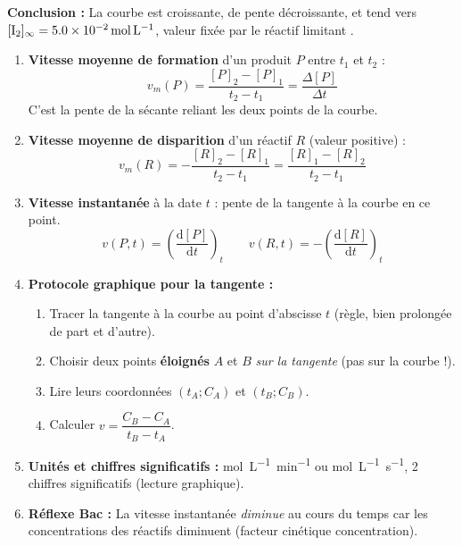 \documentclass[11pt]{article}
\newcommand{\cle}[1]{{\popxbold\color{popdark}#1}}
\begin{document}
\begin{exoresolu}
\textbf{Conclusion :} La courbe est croissante, de pente décroissante, et tend vers $[\ce{I2}]_{\infty} = \SI{5,0e-2}{mol.L^{-1}}$, valeur fixée par le réactif limitant .
\end{exoresolu}

\begin{methode}[Déterminer vitesse moyenne et vitesse instantanée à partir d'une courbe $C=f(t)$]
\begin{enumerate}
\item \textbf{Vitesse moyenne de formation} d'un produit $P$ entre $t_1$ et $t_2$ :
      \[ v_{m}(P) = \frac{[P]_2 - [P]_1}{t_2 - t_1} = \frac{\Delta [P]}{\Delta t} \]
      C'est la pente de la \cle{sécante} reliant les deux points de la courbe.
\item \textbf{Vitesse moyenne de disparition} d'un réactif $R$ (valeur positive) :
      \[ v_{m}(R) = -\frac{[R]_2 - [R]_1}{t_2 - t_1} = \frac{[R]_1 - [R]_2}{t_2 - t_1} \]
\item \textbf{Vitesse instantanée} à la date $t$ : pente de la \cle{tangente} à la courbe en ce point.
      \[ v(P,t) = \left(\frac{\mathrm{d}[P]}{\mathrm{d}t}\right)_t \qquad v(R,t) = -\left(\frac{\mathrm{d}[R]}{\mathrm{d}t}\right)_t \]
\item \textbf{Protocole graphique pour la tangente :}
      \begin{enumerate}
      \item Tracer la tangente à la courbe au point d'abscisse $t$ (règle, bien prolongée de part et d'autre).
      \item Choisir deux points \textbf{éloignés} $A$ et $B$ \emph{sur la tangente} (pas sur la courbe !).
      \item Lire leurs coordonnées $(t_A; C_A)$ et $(t_B; C_B)$.
      \item Calculer $v = \dfrac{C_B - C_A}{t_B - t_A}$.
      \end{enumerate}
\item \textbf{Unités et chiffres significatifs :} \si{mol.L^{-1}.min^{-1}} ou \si{mol.L^{-1}.s^{-1}}, 2 chiffres significatifs (lecture graphique).
\item \textbf{Réflexe Bac :} La vitesse instantanée \emph{diminue} au cours du temps car les concentrations des réactifs diminuent (facteur cinétique concentration).
\end{enumerate}
\end{methode}
\end{document}
